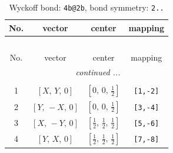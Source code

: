 \documentclass[fleqn,8pt]{jsarticle}
\begin{document}
\renewcommand{\arraystretch}{1.2}
\begin{longtable}{cccc}
\caption{Wyckoff bond: {\tt 4b@2b}, bond symmetry: {\tt 2..}}
 \\
 \hline \hline
No. & vector & center & mapping \\ \hline \endfirsthead

\multicolumn{3}{l}{\tablename\ \thetable{}} \\
 \hline \hline
No. & vector & center & mapping \\ \hline \endhead

 \hline \hline
\multicolumn{3}{r}{\footnotesize\it continued ...} \\ \endfoot

 \hline \hline
\multicolumn{3}{r}{} \\ \endlastfoot

1 & $\left[ X,\, Y,\, 0 \right]$ & $\left[ 0,\, 0,\, \frac{1}{2} \right]$ & {\tt [1,-2]} \\ \hline
2 & $\left[ Y,\, - X,\, 0 \right]$ & $\left[ 0,\, 0,\, \frac{1}{2} \right]$ & {\tt [3,-4]} \\ \hline
3 & $\left[ X,\, - Y,\, 0 \right]$ & $\left[ \frac{1}{2},\, \frac{1}{2},\, \frac{1}{2} \right]$ & {\tt [5,-6]} \\ \hline
4 & $\left[ Y,\, X,\, 0 \right]$ & $\left[ \frac{1}{2},\, \frac{1}{2},\, \frac{1}{2} \right]$ & {\tt [7,-8]} \\
\end{longtable}
\renewcommand{\arraystretch}{1.2}
\end{document}
